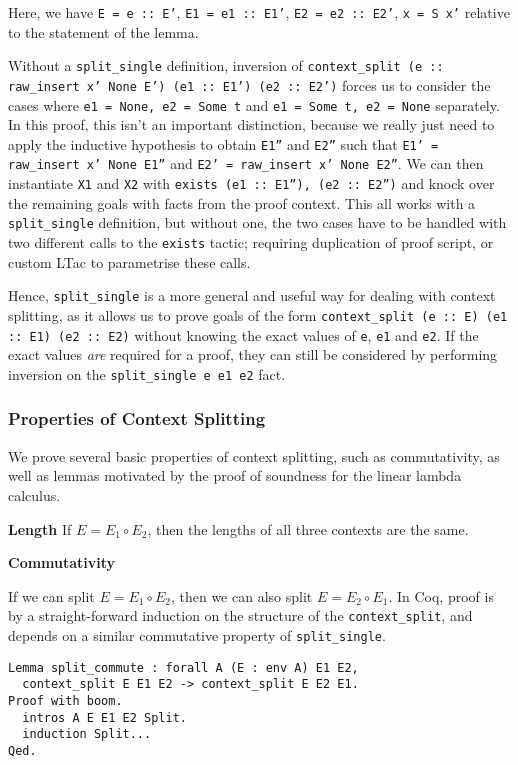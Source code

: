 \documentclass[]{unswthesis}
\let\c\texttt
\let\i\textit
\begin{document}
Here, we have \c{E = e :: E'}, \c{E1 = e1 :: E1'}, \c{E2 = e2 :: E2'}, \c{x = S x'} relative to the statement of the lemma.

Without a \c{split_single} definition, inversion of \c{context_split (e :: raw_insert x' None E') (e1 :: E1') (e2 :: E2')} forces us to consider the cases where \c{e1 = None, e2 = Some t} and \c{e1 = Some t, e2 = None} separately. In this proof, this isn't an important distinction, because we really just need to apply the inductive hypothesis to obtain \c{E1''} and \c{E2''} such that \c{E1' = raw_insert x' None E1''} and \c{E2' = raw_insert x' None E2''}. We can then instantiate \c{X1} and \c{X2} with \c{exists (e1 :: E1''), (e2 :: E2'')} and knock over the remaining goals with facts from the proof context. This all works with a \c{split_single} definition, but without one, the two cases have to be handled with two different calls to the \c{exists} tactic; requiring duplication of proof script, or custom LTac to parametrise these calls.

Hence, \c{split_single} is a more general and useful way for dealing with context splitting, as it allows us to prove goals of the form \c{context_split (e :: E) (e1 :: E1) (e2 :: E2)} without knowing the exact values of \c{e}, \c{e1} and \c{e2}. If the exact values \i{are} required for a proof, they can still be considered by performing inversion on the \c{split_single e e1 e2} fact.

\subsubsection{Properties of Context Splitting}

We prove several basic properties of context splitting, such as commutativity, as well as lemmas motivated by the proof of soundness for the linear lambda calculus.

\textbf{Length} If $E = E_1 \circ E_2$, then the lengths of all three contexts are the same.

\textbf{Commutativity}

If we can split $E = E_1 \circ E_2$, then we can also split $E = E_2 \circ E_1$. In Coq, proof is by a straight-forward induction on the structure of the \c{context_split}, and depends on a similar commutative property of \c{split_single}.

\begin{verbatim}
Lemma split_commute : forall A (E : env A) E1 E2,
  context_split E E1 E2 -> context_split E E2 E1.
Proof with boom.
  intros A E E1 E2 Split.
  induction Split...
Qed.
\end{verbatim}
\end{document}
